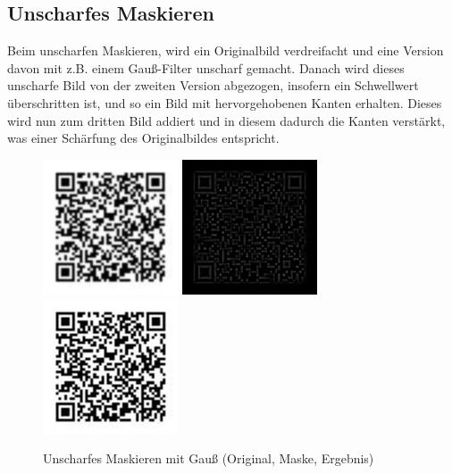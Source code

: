 \subsection*{Unscharfes Maskieren}
\label{sec:unsharp}
Beim unscharfen Maskieren, wird ein Originalbild verdreifacht und eine Version davon mit z.B. einem Gauß-Filter unscharf gemacht. Danach wird dieses unscharfe Bild von der zweiten Version abgezogen, insofern ein Schwellwert überschritten ist, und so ein Bild mit hervorgehobenen Kanten erhalten. Dieses wird nun zum dritten Bild addiert und in diesem dadurch die Kanten verstärkt, was einer Schärfung des Originalbildes entspricht.
\begin{figure}[H]
  \centering
  \includegraphics[height=4cm]{img/QR/blurry_03_3.jpg}
  \includegraphics[height=4cm]{img/QR/qr-unsharpmask.jpg}
  \includegraphics[height=4cm]{img/QR/qr-unsharpmask-sharp.jpg}
  \caption{Unscharfes Maskieren mit Gauß (Original, Maske, Ergebnis)}
  \label{fig:unsharpmask}
\end{figure}


